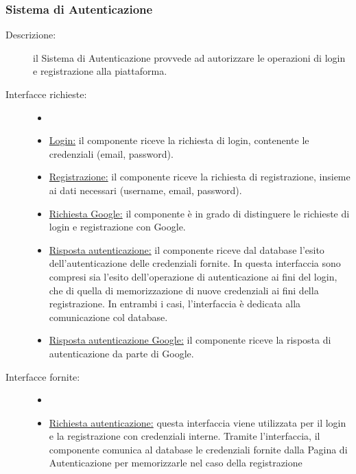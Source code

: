 \documentclass[11pt, a4paper]{article}
\theoremstyle{definition} %
\begin{document}
\subsubsection{Sistema di Autenticazione}
\begin{description}
    \item[Descrizione:] il Sistema di Autenticazione provvede ad
    autorizzare le operazioni di login e registrazione alla piattaforma.

    \item[Interfacce richieste:]
    \begin{itemize}
        \item[]

        \item \underline{Login:} il componente riceve la richiesta di
        login, contenente le credenziali (email, password).

        \item \underline{Registrazione:} il componente riceve la richiesta
        di registrazione, insieme ai dati necessari (username, email, password).

        \item \underline{Richiesta Google:} il componente è in grado di
        distinguere le richieste di login e registrazione con Google.

        \item \underline{Risposta autenticazione:} il componente riceve
        dal database l'esito dell'autenticazione delle credenziali fornite.
        In questa interfaccia sono compresi sia l'esito dell'operazione di
        autenticazione ai fini del login, che di quella di memorizzazione
        di nuove credenziali ai fini della registrazione. In entrambi i casi,
        l'interfaccia è dedicata alla comunicazione col database.

        \item \underline{Risposta autenticazione Google:} il componente
        riceve la risposta di autenticazione da parte di Google.
    \end{itemize}

    \item[Interfacce fornite:]
    \begin{itemize}
        \item[]

        \item \underline{Richiesta autenticazione:} questa interfaccia viene
        utilizzata per il login e la registrazione con credenziali interne.
        Tramite l'interfaccia, il componente comunica al database le
        credenziali fornite dalla Pagina di Autenticazione per memorizzarle
        nel caso della registrazione


\end{itemize}
\end{description}
\end{document}
